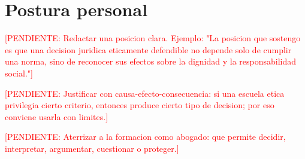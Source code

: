 \documentclass[
	spanish,
	letterpaper, oneside
]{article}
\newcommand{\pendiente}[1]{\textcolor{red}{[PENDIENTE: #1]}}
\begin{document}
%

\section{Postura personal}

\pendiente{Redactar una posicion clara. Ejemplo: "La posicion que sostengo es que una decision juridica eticamente defendible no depende solo de cumplir una norma, sino de reconocer sus efectos sobre la dignidad y la responsabilidad social."}

\pendiente{Justificar con causa-efecto-consecuencia: si una escuela etica privilegia cierto criterio, entonces produce cierto tipo de decision; por eso conviene usarla con limites.}

\pendiente{Aterrizar a la formacion como abogado: que permite decidir, interpretar, argumentar, cuestionar o proteger.}
\end{document}
